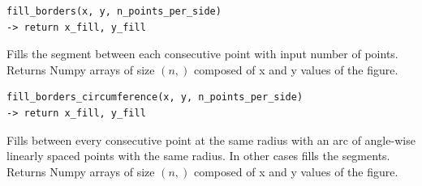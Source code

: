 \begin{verbatim}
fill_borders(x, y, n_points_per_side)
-> return x_fill, y_fill
\end{verbatim}
\hspace*{2em} Fills the segment between each consecutive point with input number of points. Returns Numpy arrays of size $(n,)$ composed of x and y values of the figure.

\begin{verbatim}
fill_borders_circumference(x, y, n_points_per_side)
-> return x_fill, y_fill
\end{verbatim}
\hspace*{2em} Fills between every consecutive point at the same radius with an arc of angle-wise linearly spaced points with the same radius. In other cases fills the segments. Returns Numpy arrays of size $(n,)$ composed of x and y values of the figure.

